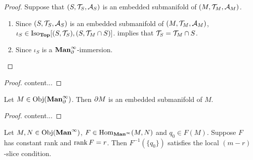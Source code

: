 \documentclass{book}
\begin{document}
	\begin{proof}
		Suppose that $(S, \mathcal{T}_S, \mathcal{A}_S)$ is an embedded submanifold of $(M, \mathcal{T}_M, \mathcal{A}_M)$. 
		\begin{enumerate}
			\item Since $(S, \mathcal{T}_S, \mathcal{A}_S)$ is an embedded submanifold of $(M, \mathcal{T}_M, \mathcal{A}_M)$, $\iota_S \in \operatorname{Iso}_{\operatorname*{\text{\textbf{Top}}}}[(S, \mathcal{T}_S), (S, \mathcal{T}_M \cap S)]$.  implies that $\mathcal{T}_S = \mathcal{T}_M \cap S$. 
			\item Since $\iota_S$ is a $\operatorname*{\text{\textbf{Man}}^{\infty}_{\partial}}$-immersion.
		\end{enumerate}
		
		
		
		
	\end{proof}

	\begin{ex} 
		
	\end{ex}
	
	\begin{proof}
		content...
	\end{proof}
	
	\begin{ex}
	 Let $M \in \operatorname{Obj}(\operatorname*{\text{\textbf{Man}}^{\infty}_{\partial}})$. Then $\partial M$ is an embedded submanifold of $M$.  
	\end{ex}	

	\begin{proof}
		content...
	\end{proof}

	\begin{ex}
		Let $M, N \in \operatorname{Obj}(\operatorname*{\text{\textbf{Man}}^{\infty}})$, $F \in \operatorname{Hom}_{\operatorname*{\text{\textbf{Man}}^{\infty}}}(M,N)$ and $q_0 \in F(M)$. Suppose $F$ has constant rank and $\operatorname{\text{rank}} F = r$. Then $F^{-1}(\{q_0\})$ satisfies the local $(m-r)$-slice condition. 
	\end{ex}
\end{document}
